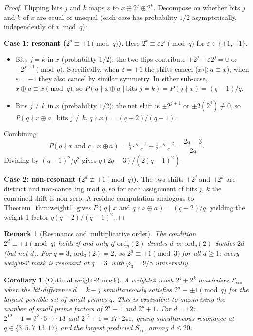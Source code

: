 \documentclass[11pt]{article}
\newtheorem{corollary}[theorem]{Corollary}
\newtheorem{remark}{Remark}
\newcommand{\ord}{\mathrm{ord}}
\begin{document}
\begin{proof}
Flipping bits $j$ and $k$ maps $x$ to $x \oplus 2^j \oplus 2^k$.
Decompose on whether bits $j$ and $k$ of $x$ are equal or unequal
(each case has probability $1/2$ asymptotically, independently of $x \bmod q$):

\smallskip
\noindent\textbf{Case 1: resonant ($2^d \equiv \pm 1 \pmod{q}$).}
Here $2^k \equiv \varepsilon 2^j \pmod{q}$ for $\varepsilon \in \{+1,-1\}$.
\begin{itemize}
\item Bits $j = k$ in $x$ (probability $1/2$): the two flips contribute
  $\pm 2^j \pm \varepsilon 2^j = 0$ or $\pm 2^{j+1} \pmod{q}$.
  Specifically, when $\varepsilon = +1$ the shifts cancel ($x \oplus a \equiv x$);
  when $\varepsilon = -1$ they also cancel by similar symmetry.
  In either sub-case, $x \oplus a \equiv x \pmod{q}$,
  so $P(q \nmid x \oplus a \mid \text{bits } j = k) = P(q \nmid x) = (q-1)/q$.
\item Bits $j \neq k$ in $x$ (probability $1/2$): the net shift is
  $\pm 2^{j+1}$ or $\pm 2(2^j) \not\equiv 0$, so
  $P(q \nmid x \oplus a \mid \text{bits } j \neq k,\, q \nmid x) = (q-2)/(q-1)$.
\end{itemize}
Combining:
\[
  P(q \nmid x \text{ and } q \nmid x \oplus a)
  = \tfrac{1}{2} \cdot \tfrac{q-1}{q} + \tfrac{1}{2} \cdot \tfrac{q-2}{q}
  = \frac{2q-3}{2q}.
\]
Dividing by $(q-1)^2/q^2$ gives $q(2q-3)/(2(q-1)^2)$.

\smallskip
\noindent\textbf{Case 2: non-resonant ($2^d \not\equiv \pm 1 \pmod{q}$).}
The two shifts $\pm 2^j$ and $\pm 2^k$ are distinct and non-cancelling mod $q$,
so for each assignment of bits $j$, $k$ the combined shift is non-zero.
A residue computation analogous to Theorem~\ref{thm:weight1}
gives $P(q \nmid x \text{ and } q \nmid x \oplus a) = (q-2)/q$,
yielding the weight-1 factor $q(q-2)/(q-1)^2$.
\end{proof}

\begin{remark}[Resonance and multiplicative order]
The condition $2^d \equiv \pm 1 \pmod{q}$ holds if and only if
$\ord_q(2)$ divides $d$ or $\ord_q(2)$ divides $2d$ (but not $d$).
For $q = 3$, $\ord_3(2) = 2$, so $2^d \equiv \pm 1 \pmod 3$ for
\emph{all} $d \geq 1$: every weight-2 mask is resonant at $q = 3$,
with $\varphi_3 = 9/8$ universally.
\end{remark}

\begin{corollary}[Optimal weight-2 mask]
A weight-2 mask $2^j + 2^k$ maximises $S_{\mathrm{xor}}$ when
the bit-difference $d = k - j$ simultaneously satisfies
$2^d \equiv \pm 1 \pmod{q}$ for the largest possible set of small primes $q$.
This is equivalent to maximising the number of small prime factors of
$2^d - 1$ and $2^d + 1$.
For $d = 12$: $2^{12} - 1 = 3^2 \cdot 5 \cdot 7 \cdot 13$
and $2^{12} + 1 = 17 \cdot 241$,
giving simultaneous resonance at $q \in \{3, 5, 7, 13, 17\}$
and the largest predicted $S_{\mathrm{xor}}$ among $d \leq 20$.
\end{corollary}
\end{document}
